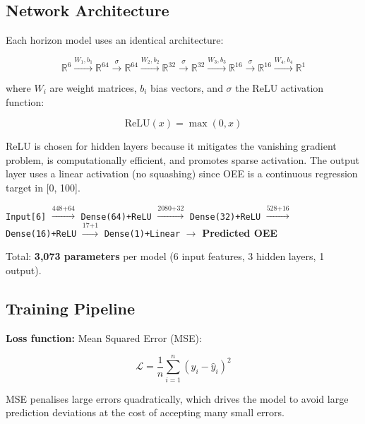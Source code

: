 \documentclass[a4paper,11pt]{article}
\begin{document}
\subsection{Network Architecture}

Each horizon model uses an identical architecture:

\begin{equation}
\mathbb{R}^{6} \xrightarrow{W_1, b_1} \mathbb{R}^{64} \xrightarrow{\sigma} \mathbb{R}^{64} \xrightarrow{W_2, b_2} \mathbb{R}^{32} \xrightarrow{\sigma} \mathbb{R}^{32} \xrightarrow{W_3, b_3} \mathbb{R}^{16} \xrightarrow{\sigma} \mathbb{R}^{16} \xrightarrow{W_4, b_4} \mathbb{R}^{1}
\end{equation}

where $W_i$ are weight matrices, $b_i$ bias vectors, and $\sigma$ the ReLU activation function:

\begin{equation}
\text{ReLU}(x) = \max(0, x)
\end{equation}

ReLU is chosen for hidden layers because it mitigates the vanishing gradient problem, is computationally efficient, and promotes sparse activation. The output layer uses a linear activation (no squashing) since OEE is a continuous regression target in [0, 100].

\begin{center}
\texttt{Input[6]} $\xrightarrow{\text{448+64}}$ \texttt{Dense(64)+ReLU} $\xrightarrow{\text{2080+32}}$ \texttt{Dense(32)+ReLU} $\xrightarrow{\text{528+16}}$ \texttt{Dense(16)+ReLU} $\xrightarrow{\text{17+1}}$ \texttt{Dense(1)+Linear} $\rightarrow$ \textbf{Predicted OEE}
\end{center}
\noindent Total: \textbf{3,073 parameters} per model (6 input features, 3 hidden layers, 1 output).

\subsection{Training Pipeline}

\textbf{Loss function:} Mean Squared Error (MSE):

\begin{equation}
\mathcal{L} = \frac{1}{n} \sum_{i=1}^{n} (y_i - \hat{y}_i)^2
\end{equation}

MSE penalises large errors quadratically, which drives the model to avoid large prediction deviations at the cost of accepting many small errors.
\end{document}
